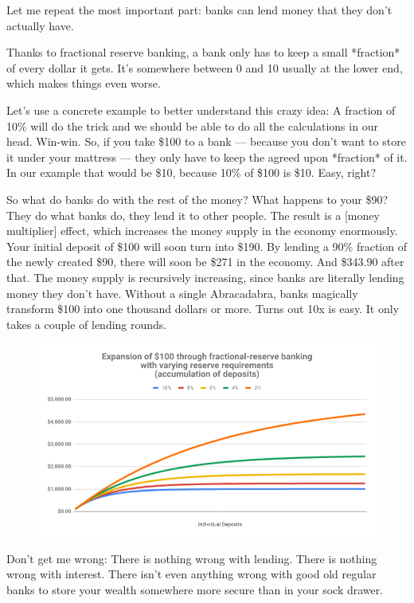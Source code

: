 Let me repeat the most important part: banks can lend money that they
don't actually have.

Thanks to fractional reserve banking, a bank only has to keep a small
*fraction* of every dollar it gets. It's somewhere between 0 and 10%
usually at the lower end, which makes things even worse.

Let's use a concrete example to better understand this crazy idea: A
fraction of 10\% will do the trick and we should be able to do all the
calculations in our head. Win-win. So, if you take \$100 to a
bank --- because you don't want to store it under your mattress --- they
only have to keep the agreed upon *fraction* of it. In our example that
would be \$10, because 10\% of \$100 is \$10. Easy, right?

So what do banks do with the rest of the money? What happens to your
\$90? They do what banks do, they lend it to other people. The result is
a [money multiplier] effect, which increases the money supply in the
economy enormously. Your initial deposit of \$100 will soon turn into
\$190. By lending a 90\% fraction of the newly created \$90, there will
soon be \$271 in the economy. And \$343.90 after that. The money supply
is recursively increasing, since banks are literally lending money they
don't have. Without a single Abracadabra, banks magically transform
\$100 into one thousand dollars or more. Turns out 10x is easy. It only
takes a couple of lending rounds.

\begin{figure}
  \centering
  \includegraphics{assets/images/money-multiplier.png}
  \label{fig:money-multiplier}
\end{figure}

Don't get me wrong: There is nothing wrong with lending. There is
nothing wrong with interest. There isn't even anything wrong with good
old regular banks to store your wealth somewhere more secure than in
your sock drawer.

